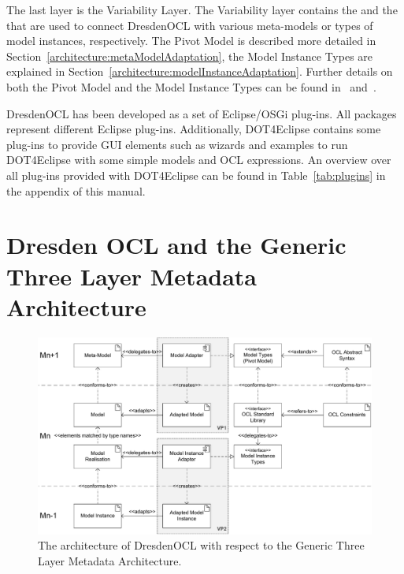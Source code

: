 The last layer is the Variability Layer. The Variability layer contains the
 and the  that are used to
connect DresdenOCL with various meta-models or types of model instances,
respectively. The Pivot Model is described more detailed in
Section~\ref{architecture:metaModelAdaptation}, the Model Instance Types are
explained in Section~\ref{architecture:modelInstanceAdaptation}. Further details
on both the Pivot Model and the Model Instance Types can be found 
in~\cite{braeuerEA:OCL2007} and~\cite{wilkeEA:MODELS2010}.

DresdenOCL has been developed as a set of Eclipse/\acs{OSGi} plug-ins. All
packages represent different Eclipse plug-ins. Additionally, \acl{DOT4Eclipse}
contains some plug-ins to provide \acs{GUI} elements such as wizards and 
examples to run \acl{DOT4Eclipse} with some simple models and \acs{OCL} 
expressions. An overview over all plug-ins provided with \acl{DOT4Eclipse} can
be found in Table~\ref{tab:plugins} in the appendix of this manual.



\section{Dresden OCL and the Generic Three La\-yer Me\-ta\-da\-ta Architecture}
\label{theory:DOTLayers}

\begin{figure}
	\centering
	\includegraphics[width=1.0\linewidth]{figures/architecture/modeladaptation}
	\caption{The architecture of DresdenOCL with respect to the Generic Three Layer
	Metadata Architecture.}
	\label{pic:architecture:genericArchitecture}
\end{figure}

